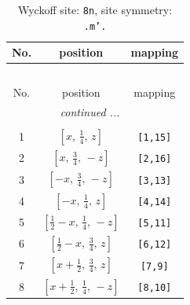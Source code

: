 \documentclass[fleqn,8pt]{jsarticle}
\begin{document}
\begin{longtable}{ccc}
\caption{Wyckoff site: {\tt 8n}, site symmetry: {\tt .m'.}}
 \\
 \hline \hline
No. & position & mapping \\ \hline \endfirsthead

\multicolumn{2}{l}{\tablename\ \thetable{}} \\
 \hline \hline
No. & position & mapping \\ \hline \endhead

 \hline \hline
\multicolumn{2}{r}{\footnotesize\it continued ...} \\ \endfoot

 \hline \hline
\multicolumn{2}{r}{} \\ \endlastfoot

1 & $\left[ x,\, \frac{1}{4},\, z \right]$ & {\tt [1,15]} \\ \hline
2 & $\left[ x,\, \frac{3}{4},\, - z \right]$ & {\tt [2,16]} \\ \hline
3 & $\left[ - x,\, \frac{3}{4},\, - z \right]$ & {\tt [3,13]} \\ \hline
4 & $\left[ - x,\, \frac{1}{4},\, z \right]$ & {\tt [4,14]} \\ \hline
5 & $\left[ \frac{1}{2} - x,\, \frac{1}{4},\, - z \right]$ & {\tt [5,11]} \\ \hline
6 & $\left[ \frac{1}{2} - x,\, \frac{3}{4},\, z \right]$ & {\tt [6,12]} \\ \hline
7 & $\left[ x + \frac{1}{2},\, \frac{3}{4},\, z \right]$ & {\tt [7,9]} \\ \hline
8 & $\left[ x + \frac{1}{2},\, \frac{1}{4},\, - z \right]$ & {\tt [8,10]} \\
\end{longtable}
\renewcommand{\arraystretch}{1.2}
\end{document}
